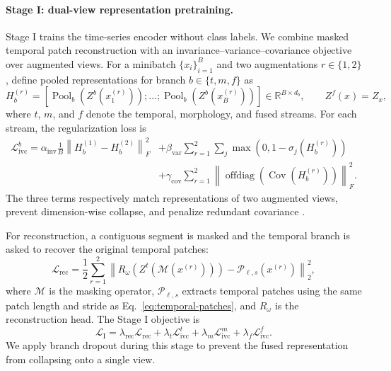\documentclass{article}
\begin{document}
\paragraph{Stage I: dual-view representation pretraining.}
Stage I trains the time-series encoder without class labels. We combine masked
temporal patch reconstruction with an invariance--variance--covariance objective
over augmented views. For a minibatch $\{x_i\}_{i=1}^{B}$ and two augmentations
$r\in\{1,2\}$, define pooled representations for branch
$b\in\{t,m,f\}$ as
\begin{equation}
\label{eq:pooled-batch-representations}
H_b^{(r)}
=
\left[
\operatorname{Pool}_b(Z^b(x_1^{(r)}));
\ldots;
\operatorname{Pool}_b(Z^b(x_B^{(r)}))
\right]
\in\mathbb{R}^{B\times d_b},
\qquad
Z^f(x)=Z_x,
\end{equation}
where $t$, $m$, and $f$ denote the temporal, morphology, and fused streams. For
each stream, the regularization loss is
\begin{equation}
\label{eq:ivc}
\begin{aligned}
\mathcal{L}_{\mathrm{ivc}}^{b}
=
\alpha_{\mathrm{inv}}
\frac{1}{B}
\left\|
H_b^{(1)}-H_b^{(2)}
\right\|_F^2
&+
\beta_{\mathrm{var}}
\sum_{r=1}^{2}\sum_j
\max
\left(
0,
1-\sigma_j(H_b^{(r)})
\right) \\
&+
\gamma_{\mathrm{cov}}
\sum_{r=1}^{2}
\left\|
\operatorname{offdiag}
\left(
\operatorname{Cov}(H_b^{(r)})
\right)
\right\|_F^2 .
\end{aligned}
\end{equation}
The three terms respectively match representations of two augmented views,
prevent dimension-wise collapse, and penalize redundant covariance
\citep{bardes2022vicreg}.

For reconstruction, a contiguous segment is masked and the temporal branch is
asked to recover the original temporal patches:
\begin{equation}
\label{eq:masked-rec}
\mathcal{L}_{\mathrm{rec}}
=
\frac{1}{2}
\sum_{r=1}^{2}
\left\|
R_{\omega}
\left(
Z^{t}(\mathcal{M}(x^{(r)}))
\right)
-
\mathcal{P}_{\ell,s}(x^{(r)})
\right\|_2^2,
\end{equation}
where $\mathcal{M}$ is the masking operator,
$\mathcal{P}_{\ell,s}$ extracts temporal patches using the same patch length and
stride as Eq.~\eqref{eq:temporal-patches}, and $R_{\omega}$ is the
reconstruction head. The Stage I objective is
\begin{equation}
\label{eq:stage1-loss}
\mathcal{L}_{\mathrm{I}}
=
\lambda_{\mathrm{rec}}\mathcal{L}_{\mathrm{rec}}
+
\lambda_t\mathcal{L}_{\mathrm{ivc}}^{t}
+
\lambda_m\mathcal{L}_{\mathrm{ivc}}^{m}
+
\lambda_f\mathcal{L}_{\mathrm{ivc}}^{f}.
\end{equation}
We apply branch dropout during this stage to prevent the fused representation from
collapsing onto a single view.
\end{document}
